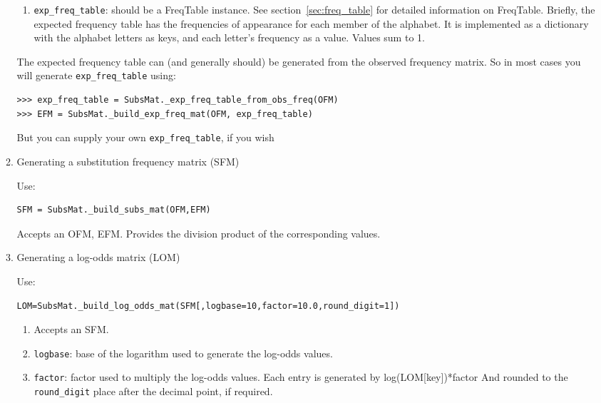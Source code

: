 \begin{enumerate}
\begin{enumerate}
  \begin{enumerate}
    \item \verb|exp_freq_table|: should be a FreqTable instance. See section~\ref{sec:freq_table} for detailed information on FreqTable. Briefly, the expected frequency table has the frequencies of appearance for each member of the alphabet. It is
  implemented as a dictionary with the alphabet letters as keys, and each letter's frequency as a value. Values sum to 1.
  \end{enumerate}

The expected frequency table can (and generally should) be generated from the observed frequency matrix. So in most cases you will generate \verb|exp_freq_table| using:

\begin{verbatim}
>>> exp_freq_table = SubsMat._exp_freq_table_from_obs_freq(OFM)
>>> EFM = SubsMat._build_exp_freq_mat(OFM, exp_freq_table)
\end{verbatim}

But you can supply your own \verb|exp_freq_table|, if you wish

\item Generating a substitution frequency matrix (SFM)

Use:

\begin{verbatim}
SFM = SubsMat._build_subs_mat(OFM,EFM)
\end{verbatim}

  Accepts an OFM, EFM. Provides the division product of the corresponding values.

\item Generating a log-odds matrix (LOM)

   Use:
\begin{verbatim}
LOM=SubsMat._build_log_odds_mat(SFM[,logbase=10,factor=10.0,round_digit=1])
\end{verbatim}

   \begin{enumerate}
     \item Accepts an SFM.

     \item \verb|logbase|: base of the logarithm used to generate the log-odds values.

     \item \verb|factor|: factor used to multiply the log-odds values.  Each entry is generated by log(LOM[key])*factor And rounded to the \verb|round_digit| place after the decimal point, if required.


\end{enumerate}
\end{enumerate}
\end{enumerate}
